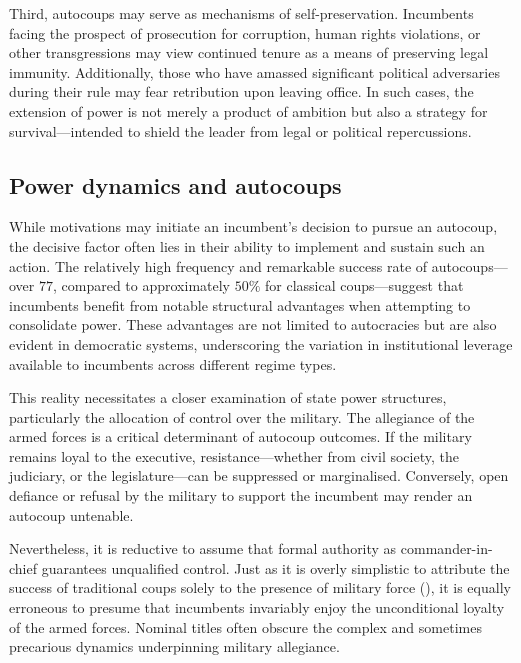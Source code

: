 \documentclass[
  12pt,
]{report}
\begin{document}
Third, autocoups may serve as mechanisms of self-preservation.
Incumbents facing the prospect of prosecution for corruption, human
rights violations, or other transgressions may view continued tenure as
a means of preserving legal immunity. Additionally, those who have
amassed significant political adversaries during their rule may fear
retribution upon leaving office. In such cases, the extension of power
is not merely a product of ambition but also a strategy for
survival---intended to shield the leader from legal or political
repercussions.

\subsection*{Power dynamics and
autocoups}\label{power-dynamics-and-autocoups}

While motivations may initiate an incumbent's decision to pursue an
autocoup, the decisive factor often lies in their ability to implement
and sustain such an action. The relatively high frequency and remarkable
success rate of autocoups---over \(77%
\), compared to approximately \(50\%\) for classical coups---suggest
that incumbents benefit from notable structural advantages when
attempting to consolidate power. These advantages are not limited to
autocracies but are also evident in democratic systems, underscoring the
variation in institutional leverage available to incumbents across
different regime types.

This reality necessitates a closer examination of state power
structures, particularly the allocation of control over the military.
The allegiance of the armed forces is a critical determinant of autocoup
outcomes. If the military remains loyal to the executive,
resistance---whether from civil society, the judiciary, or the
legislature---can be suppressed or marginalised. Conversely, open
defiance or refusal by the military to support the incumbent may render
an autocoup untenable.

Nevertheless, it is reductive to assume that formal authority as
commander-in-chief guarantees unqualified control. Just as it is overly
simplistic to attribute the success of traditional coups solely to the
presence of military force (), it is
equally erroneous to presume that incumbents invariably enjoy the
unconditional loyalty of the armed forces. Nominal titles often obscure
the complex and sometimes precarious dynamics underpinning military
allegiance.
\end{document}
